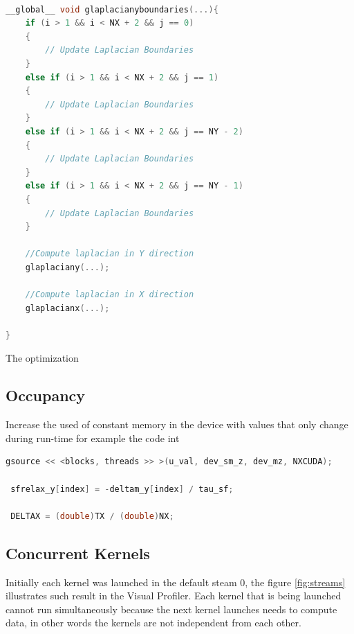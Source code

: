 \begin{lstlisting}[language=C++, caption={Evaluation of x, y, z coordinates of the Zhang and Li model in a single kernel}]

__global__ void glaplacianyboundaries(...){
    if (i > 1 && i < NX + 2 && j == 0)
    {
     	// Update Laplacian Boundaries
    }
    else if (i > 1 && i < NX + 2 && j == 1)
    {
  		// Update Laplacian Boundaries
    }
    else if (i > 1 && i < NX + 2 && j == NY - 2)
    {
        // Update Laplacian Boundaries
    }
    else if (i > 1 && i < NX + 2 && j == NY - 1)
    {
        // Update Laplacian Boundaries
    }
    
    //Compute laplacian in Y direction
    glaplaciany(...);

	//Compute laplacian in X direction
	glaplacianx(...);
    
}
\end{lstlisting}

The optimization

\subsection{Occupancy}
 
 
 
 Increase the used of constant memory in the device with values that only change during run-time for example the code int 
 
 
 \begin{lstlisting}[language=C++, caption={Evaluation of x, y, z coordinates of the Zhang and Li model in a single kernel}]
 gsource << <blocks, threads >> >(u_val, dev_sm_z, dev_mz, NXCUDA);
  
 sfrelax_y[index] = -deltam_y[index] / tau_sf;
     
 DELTAX = (double)TX / (double)NX;
\end{lstlisting}
 
 

\subsection{Concurrent Kernels}

Initially each kernel was launched in the default steam 0, the figure \ref{fig:streams} illustrates such result in the Visual Profiler. Each kernel that is being launched cannot run simultaneously because the next kernel launches needs to compute data, in other words the kernels are not independent from each other.

